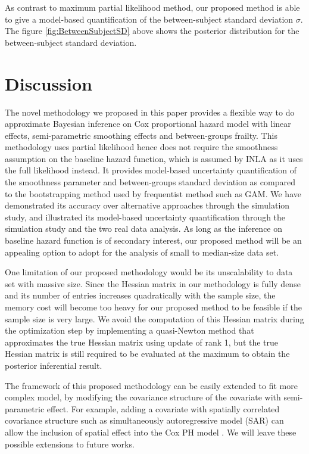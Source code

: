 \documentclass[]{article}
\begin{document}
As contrast to maximum partial likelihood method, our proposed method is able to give a model-based quantification of the between-subject standard deviation $\sigma$. The figure \ref{fig:BetweenSubjectSD} above shows the posterior distribution for the between-subject standard deviation. 



\section{Discussion}\label{sec:discussion}

The novel methodology we proposed in this paper provides a flexible way to do approximate Bayesian inference on Cox proportional hazard model with linear effects, semi-parametric smoothing effects and between-groups frailty. This methodology uses partial likelihood hence does not require the smoothness assumption on the baseline hazard function, which is assumed by INLA as it uses the full likelihood instead. It provides model-based uncertainty quantification of the smoothness parameter and between-groups standard deviation as compared to the bootstrapping method used by frequentist method such as GAM. We have demonstrated its accuracy over alternative approaches through the simulation study, and illustrated its model-based uncertainty quantification through the simulation study and the two real data analysis. As long as the inference on baseline hazard function is of secondary interest, our proposed method will be an appealing option to adopt for the analysis of small to median-size data set.

One limitation of our proposed methodology would be its unscalability to data set with massive size. Since the Hessian matrix in our methodology is fully dense and its number of entries increases quadratically with the sample size, the memory cost will become too heavy for our proposed method to be feasible if the sample size is very large. We avoid the computation of this Hessian matrix during the optimization step by implementing a quasi-Newton method that approximates the true Hessian matrix using update of rank 1, but the true Hessian matrix is still required to be evaluated at the maximum to obtain the posterior inferential result. 

The framework of this proposed methodology can be easily extended to fit more complex model, by modifying the covariance structure of the covariate with semi-parametric effect. For example, adding a covariate with spatially correlated covariance structure such as simultaneously autoregressive model (SAR) can allow the inclusion of spatial effect into the Cox PH model \citep{Spatial}. We will leave these possible extensions to future works.
\end{document}
